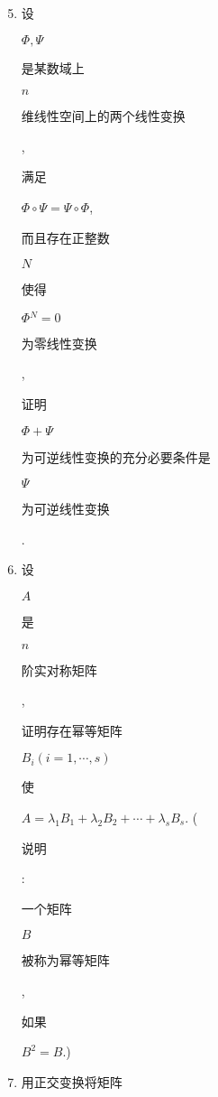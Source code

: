 \documentclass[10pt]{article}
\begin{document}
\begin{enumerate}
  \setcounter{enumi}{4}
  \item \begin{CJK}{UTF8}{mj}设\end{CJK} $\Phi, \Psi$ \begin{CJK}{UTF8}{mj}是某数域上\end{CJK} $n$ \begin{CJK}{UTF8}{mj}维线性空间上的两个线性变换\end{CJK}, \begin{CJK}{UTF8}{mj}满足\end{CJK} $\Phi \circ \Psi=\Psi \circ \Phi$, \begin{CJK}{UTF8}{mj}而且存在正整数\end{CJK} $N$ \begin{CJK}{UTF8}{mj}使得\end{CJK} $\Phi{ }^{N}=0$ \begin{CJK}{UTF8}{mj}为零线性变换\end{CJK}, \begin{CJK}{UTF8}{mj}证明\end{CJK} $\Phi+\Psi$ \begin{CJK}{UTF8}{mj}为可逆线性变换的充分必要条件是\end{CJK} $\Psi$ \begin{CJK}{UTF8}{mj}为可逆线性变换\end{CJK}.

  \item \begin{CJK}{UTF8}{mj}设\end{CJK} $A$ \begin{CJK}{UTF8}{mj}是\end{CJK} $n$ \begin{CJK}{UTF8}{mj}阶实对称矩阵\end{CJK}, \begin{CJK}{UTF8}{mj}证明存在幂等矩阵\end{CJK} $B_{i}(i=1, \cdots, s)$ \begin{CJK}{UTF8}{mj}使\end{CJK} $A=\lambda_{1} B_{1}+\lambda_{2} B_{2}+\cdots+\lambda_{s} B_{s}$. (\begin{CJK}{UTF8}{mj}说明\end{CJK}: \begin{CJK}{UTF8}{mj}一个矩阵\end{CJK} $B$ \begin{CJK}{UTF8}{mj}被称为幂等矩阵\end{CJK}, \begin{CJK}{UTF8}{mj}如果\end{CJK} $B^{2}=B$.)

  \item \begin{CJK}{UTF8}{mj}用正交变换将矩阵\end{CJK}

\end{enumerate}
\end{document}
